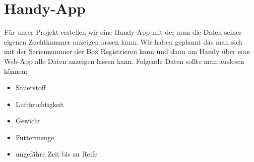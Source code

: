 \def \currentAuthor {Florian Tipotsch}

\section{Handy-App}

Für unser Projekt erstellen wir eine Handy-App mit der man die Daten seiner eigenen Zuchtkammer anzeigen lassen kann.
Wir haben geplannt das man sich mit der Seriennummer der Box Registrieren kann und dann am Handy über eine Web-App alle Daten anzeigen lassen kann. Folgende Daten sollte man auslesen können:

\begin{itemize}
	\item Sauerstoff
	\item Luftfeuchtigkeit
	\item Gewicht
	\item Futtermenge
	\item ungefähre Zeit bis zu Reife
\end{itemize}

\newpage
